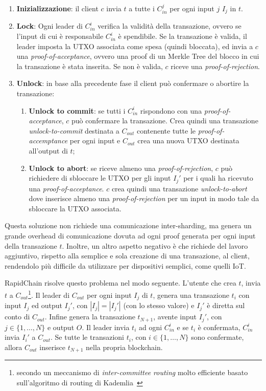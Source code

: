 \begin{enumerate}
	\item \textbf{Inizializzazione}: il client $c$ invia $t$ a tutte i $C_{in}^j$ per ogni input $j$ $I_j$ in $t$.
	\item \textbf{Lock}: Ogni leader di $C_{in}^i$ verifica la validità della transazione, ovvero se l'input di cui è responsabile $C_{in}^i$ è spendibile. Se la transazione è valida, il leader imposta la UTXO associata come spesa (quindi bloccata), ed invia a $c$ una \emph{proof-of-acceptance}, ovvero una proof di un Merkle Tree del blocco in cui la transazione è stata inserita. Se non è valida, $c$ riceve una \emph{proof-of-rejection}.
	\item \textbf{Unlock}: in base alla precedente fase il client può confermare o abortire la transazione:
	
	\begin{enumerate}
		\item \textbf{Unlock to commit}: se tutti i $C_{in}^i$ rispondono con una \emph{proof-of-acceptance}, $c$ può confermare la transazione. Crea quindi una transazione \emph{unlock-to-commit} destinata a $C_{out}$ contenente tutte le \emph{proof-of-accemptance} per ogni input e $C_{out}$ crea una nuova UTXO destinata all'output di $t$;
		\item \textbf{Unlock to abort}: se riceve almeno una \emph{proof-of-rejection}, $c$ può richiedere di sbloccare le UTXO per gli input $I_j'$ per i quali ha ricevuto una \emph{proof-of-acceptance}. $c$ crea quindi una transazione \emph{unlock-to-abort} dove inserisce almeno una \emph{proof-of-rejection} per un input in modo tale da sbloccare la UTXO associata.
	\end{enumerate}

\end{enumerate}

Questa soluzione non richiede una comunicazione inter-sharding, ma genera un grande overhead di comunicazione dovuta ad ogni proof generata per ogni input della transazione $t$. Inoltre, un altro aspetto negativo è che richiede del lavoro aggiuntivo, rispetto alla semplice e sola creazione di una transazione, al client, rendendolo più difficile da utilizzare per dispositivi semplici, come quelli IoT.

RapidChain risolve questo problema nel modo seguente. L'utente che crea $t$, invia $t$ a $C_{out}$\footnote{secondo un meccanismo di \emph{inter-committee routing} molto efficiente basato sull'algoritmo di routing di Kademlia~\cite{maymounkov2002kademlia}}. Il leader di $C_{out}$ per ogni input $I_j$ di $t$, genera una transazione $t_i$ con input $I_j$ ed output $I_j'$, con $|I_j| = |I_j'|$ (con lo stesso valore) e $I_j'$ è diretta sul conto di $C_{out}$. Infine genera la transazione $t_{N+1}$, avente input $I_j'$, con $j \in \{1, \dots, N\}$ e output $O$. Il leader invia $t_i$ ad ogni $C_{in}^i$ e se $t_i$ è confermata, $C_{in}^i$ invia $I_i'$ a $C_{out}$. Se tutte le transazioni $t_i$, con $i \in \{1, \dots, N\}$ sono confermate, allora $C_{out}$ inserisce $t_{N+1}$ nella propria blockchain.


